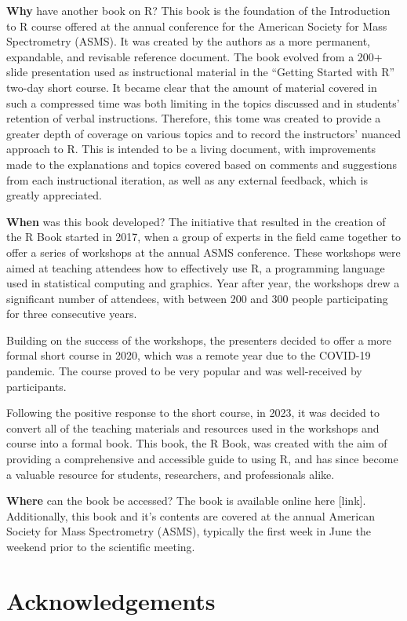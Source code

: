 \documentclass[
]{book}
\begin{document}
\textbf{Why} have another book on R? This book is the foundation of the Introduction to R course offered at the annual conference for the American Society for Mass Spectrometry (ASMS). It was created by the authors as a more permanent, expandable, and revisable reference document. The book evolved from a 200+ slide presentation used as instructional material in the ``Getting Started with R'' two-day short course. It became clear that the amount of material covered in such a compressed time was both limiting in the topics discussed and in students' retention of verbal instructions. Therefore, this tome was created to provide a greater depth of coverage on various topics and to record the instructors' nuanced approach to R. This is intended to be a living document, with improvements made to the explanations and topics covered based on comments and suggestions from each instructional iteration, as well as any external feedback, which is greatly appreciated.

\textbf{When} was this book developed? The initiative that resulted in the creation of the R Book started in 2017, when a group of experts in the field came together to offer a series of workshops at the annual ASMS conference. These workshops were aimed at teaching attendees how to effectively use R, a programming language used in statistical computing and graphics. Year after year, the workshops drew a significant number of attendees, with between 200 and 300 people participating for three consecutive years.

Building on the success of the workshops, the presenters decided to offer a more formal short course in 2020, which was a remote year due to the COVID-19 pandemic. The course proved to be very popular and was well-received by participants.

Following the positive response to the short course, in 2023, it was decided to convert all of the teaching materials and resources used in the workshops and course into a formal book. This book, the R Book, was created with the aim of providing a comprehensive and accessible guide to using R, and has since become a valuable resource for students, researchers, and professionals alike.

\textbf{Where} can the book be accessed? The book is available online here {[}link{]}. Additionally, this book and it's contents are covered at the annual American Society for Mass Spectrometry (ASMS), typically the first week in June the weekend prior to the scientific meeting.

\hypertarget{acknowledgements}{%
\chapter*{Acknowledgements}\label{acknowledgements}}
\end{document}
